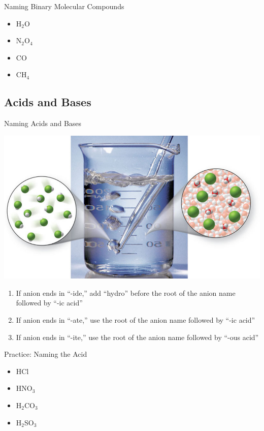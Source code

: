 \documentclass[11pt]{beamer}
\begin{document}
\begin{frame}{Naming Binary Molecular Compounds}
  \begin{itemize}
  \item H$_2$O
  \item N$_2$O$_4$
  \item CO
  \item CH$_4$
  \end{itemize}
\end{frame}

\subsection{Acids and Bases}

\begin{frame}{Naming Acids and Bases}
  \begin{center}
    \includegraphics[width=0.5\linewidth]{acid_base}
  \end{center}

  \begin{enumerate}
  \item If anion ends in ``-ide,'' add ``hydro'' before the
    root of the anion name followed by ``-ic acid''
  \item If anion ends in ``-ate,'' use the root of the anion
    name followed by ``-ic acid''
  \item If anion ends in ``-ite,'' use the root of the anion
    name followed by ``-ous acid''
  \end{enumerate}
\end{frame}

\begin{frame}{Practice: Naming the Acid}
  \begin{itemize}
  \item HCl
  \item HNO$_3$
  \item H$_2$CO$_3$
  \item H$_2$SO$_3$
  \end{itemize}
\end{frame}
\end{document}

